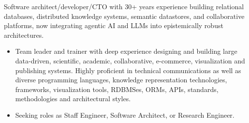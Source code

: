 \begin{par}
  Software architect/developer/CTO with 30+ years experience building relational databases, distributed knowledge systems, semantic datastores, and collaborative platforms, now integrating agentic AI and LLMs into epistemically robust architectures.

  \begin{itemize}

  \item Team leader and trainer with deep experience designing and building large data-driven, scientific, academic, collaborative, e-commerce, visualization and publishing systems. Highly proficient in technical communications as well as diverse programming languages, knowledge representation technologies, frameworks, visualization tools, RDBMSes, ORMs, APIs, standards, methodologies and architectural styles.

  \item Seeking roles as Staff Engineer, Software Architect, or Research Engineer.
  \end{itemize}
\vspace{8mm}

\end{par}
